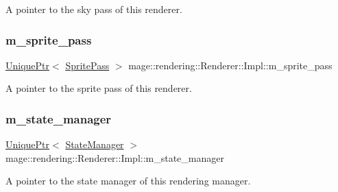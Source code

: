 A pointer to the sky pass of this renderer. \hypertarget{classmage_1_1rendering_1_1_renderer_1_1_impl_a38a33ead382177e950db18795601723a}{}\label{classmage_1_1rendering_1_1_renderer_1_1_impl_a38a33ead382177e950db18795601723a} 
\subsubsection{\texorpdfstring{m\+\_\+sprite\+\_\+pass}{m\_sprite\_pass}}
{\footnotesize\ttfamily \hyperlink{namespacemage_a3316d7143a973e37adf1110f2e80ca31}{Unique\+Ptr}$<$ \hyperlink{classmage_1_1rendering_1_1_sprite_pass}{Sprite\+Pass} $>$ mage\+::rendering\+::\+Renderer\+::\+Impl\+::m\+\_\+sprite\+\_\+pass\hspace{0.3cm}{\ttfamily [private]}}

A pointer to the sprite pass of this renderer. \hypertarget{classmage_1_1rendering_1_1_renderer_1_1_impl_a403fbd5958b798e426683c6d671b056c}{}\label{classmage_1_1rendering_1_1_renderer_1_1_impl_a403fbd5958b798e426683c6d671b056c} 
\subsubsection{\texorpdfstring{m\+\_\+state\+\_\+manager}{m\_state\_manager}}
{\footnotesize\ttfamily \hyperlink{namespacemage_a3316d7143a973e37adf1110f2e80ca31}{Unique\+Ptr}$<$ \hyperlink{classmage_1_1rendering_1_1_state_manager}{State\+Manager} $>$ mage\+::rendering\+::\+Renderer\+::\+Impl\+::m\+\_\+state\+\_\+manager\hspace{0.3cm}{\ttfamily [private]}}

A pointer to the state manager of this rendering manager. \hypertarget{classmage_1_1rendering_1_1_renderer_1_1_impl_ad0b4ff740d36e1723949213ab5ba74bc}{}\label{classmage_1_1rendering_1_1_renderer_1_1_impl_ad0b4ff740d36e1723949213ab5ba74bc} 
